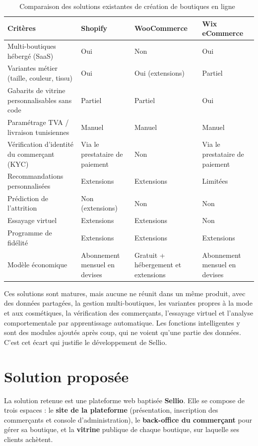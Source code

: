 \begin{table}[H]
\centering
\renewcommand{\arraystretch}{1.4}
\begin{tabular}{|p{4.6cm}|p{2.9cm}|p{2.9cm}|p{2.9cm}|}
\hline
\textbf{Critères} & \textbf{Shopify} & \textbf{WooCommerce} & \textbf{Wix eCommerce} \\
\hline
Multi-boutiques hébergé (SaaS) & Oui & Non & Oui \\
\hline
Variantes métier (taille, couleur, tissu) & Oui & Oui (extensions) & Partiel \\
\hline
Gabarits de vitrine personnalisables sans code & Partiel & Partiel & Oui \\
\hline
Paramétrage TVA / livraison tunisiennes & Manuel & Manuel & Manuel \\
\hline
Vérification d'identité du commerçant (KYC) & Via le prestataire de paiement & Non & Via le prestataire de paiement \\
\hline
Recommandations personnalisées & Extensions & Extensions & Limitées \\
\hline
Prédiction de l'attrition & Non (extensions) & Non & Non \\
\hline
Essayage virtuel & Extensions & Extensions & Non \\
\hline
Programme de fidélité & Extensions & Extensions & Extensions \\
\hline
Modèle économique & Abonnement mensuel en devises & Gratuit + hébergement et extensions & Abonnement mensuel en devises \\
\hline
\end{tabular}
\caption{Comparaison des solutions existantes de création de boutiques en ligne~\cite{Shopify2026, WooCommerce2026, Wix2026}}
\label{tab:existing}
\end{table}

Ces solutions sont matures, mais aucune ne réunit dans un même produit, avec des données partagées, la gestion multi-boutiques, les variantes propres à la mode et aux cosmétiques, la vérification des commerçants, l'essayage virtuel et l'analyse comportementale par apprentissage automatique. Les fonctions intelligentes y sont des modules ajoutés après coup, qui ne voient qu'une partie des données. C'est cet écart qui justifie le développement de Sellio.

\section{Solution proposée}
La solution retenue est une plateforme web baptisée \textbf{Sellio}. Elle se compose de trois espaces : le \textbf{site de la plateforme} (présentation, inscription des commerçants et console d'administration), le \textbf{back-office du commerçant} pour gérer sa boutique, et la \textbf{vitrine} publique de chaque boutique, sur laquelle ses clients achètent.

